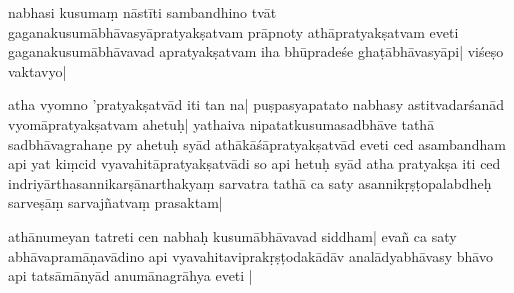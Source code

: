 nabhasi kusumaṃ nāstīti sambandhino %
tvāt gagana\mms kusumābhāvasyāpratyakṣatvam prāpnoty athāpratyakṣatvam eveti
gaganakusumābhāva\mme vad apratyakṣatvam iha bhūpradeśe ghaṭābhāvasyāpi| viśe\mms ṣo vaktavyo| %

atha vyo\mme mno 'pratyakṣatvād iti tan na| puṣpasya\mms patato nabhasy astitvadarśanād vyomāpratyakṣatvam ahetuḥ| yathaiva nipatatkusumasadbhā\mme ve %
tathā sadbhāvagrahaṇe py ahetuḥ syād athākāśāpratyakṣatvād eveti ced asamba\mms ndham api yat kiṃcid vyavahitāpratyakṣatvādi so api he\mme tuḥ syād atha %
pra\mms tyakṣa i\mme ti ced indriyārthasannikarṣānarthakyaṃ sarvatra
tathā ca saty asannikṛṣṭopalabdheḥ sarveṣāṃ sarvajñatvaṃ prasaktam|

a\mms thānumeyan tatreti cen nabhaḥ ku\mme sumābhāvavad %
%
siddham| evañ ca saty abhāvapramāṇavādino api vyavahitaviprakṛṣṭodakādāv analādyabhāvasy%
bhāvo api tatsā\mms mānyā\mme d anumānagrāhya eveti %
|


